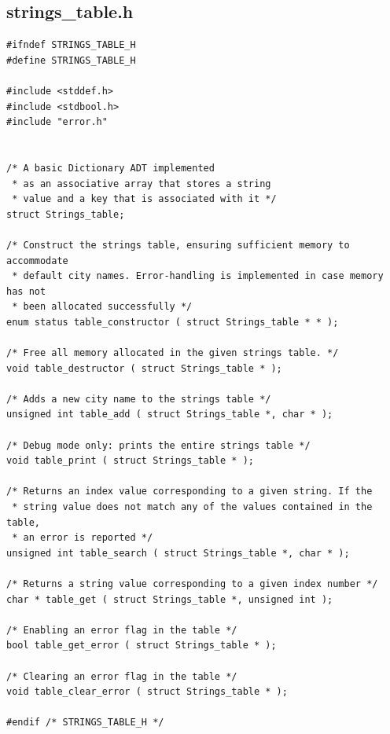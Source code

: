 \documentclass[11pt]{article}
\begin{document}
\subsection{strings\_table.h}
\begin{verbatim}
#ifndef STRINGS_TABLE_H
#define STRINGS_TABLE_H

#include <stddef.h>
#include <stdbool.h>
#include "error.h"


/* A basic Dictionary ADT implemented
 * as an associative array that stores a string
 * value and a key that is associated with it */
struct Strings_table;

/* Construct the strings table, ensuring sufficient memory to accommodate
 * default city names. Error-handling is implemented in case memory has not
 * been allocated successfully */
enum status table_constructor ( struct Strings_table * * );

/* Free all memory allocated in the given strings table. */
void table_destructor ( struct Strings_table * );

/* Adds a new city name to the strings table */
unsigned int table_add ( struct Strings_table *, char * );

/* Debug mode only: prints the entire strings table */
void table_print ( struct Strings_table * );

/* Returns an index value corresponding to a given string. If the
 * string value does not match any of the values contained in the table,
 * an error is reported */
unsigned int table_search ( struct Strings_table *, char * );

/* Returns a string value corresponding to a given index number */
char * table_get ( struct Strings_table *, unsigned int );

/* Enabling an error flag in the table */
bool table_get_error ( struct Strings_table * );

/* Clearing an error flag in the table */
void table_clear_error ( struct Strings_table * );

#endif /* STRINGS_TABLE_H */
\end{verbatim}
\newpage
\end{document}
